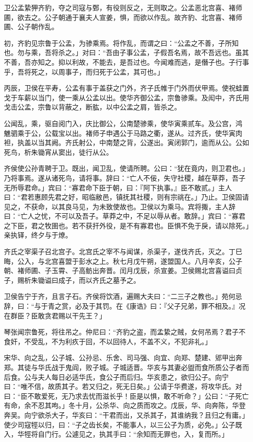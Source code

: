 \documentclass[]{article}
\begin{document}
卫公孟絷狎齐豹，夺之司寇与鄄，有役则反之，无则取之。公孟恶北宫喜、褚师圃，欲去之。公子朝通于襄夫人宣姜，惧，而欲以作乱。故齐豹、北宫喜、褚师圃、公子朝作乱。

初，齐豹见宗鲁于公孟，为骖乘焉。将作乱，而谓之曰：``公孟之不善，子所知也。勿与乘，吾将杀之。」对曰：``吾由子事公孟，子假吾名焉，故不吾远也。虽其不善，吾亦知之。抑以利故，不能去，是吾过也。今闻难而逃，是僭子也。子行事乎，吾将死之，以周事子，而归死于公孟，其可也。」

丙辰，卫侯在平寿，公孟有事于盖获之门外，齐子氏帷于门外而伏甲焉。使祝蛙置戈于车薪以当门，使一乘从公孟以出。使华齐御公孟，宗鲁骖乘。及闳中，齐氏用戈击公孟，宗鲁以背蔽之，断肱，以中公孟之肩，皆杀之。

公闻乱，乘，驱自阅门入，庆比御公，公南楚骖乘，使华寅乘贰车。及公宫，鸿\\
魋驷乘于公，公载宝以出。褚师子申遇公于马路之衢，遂从。过齐氏，使华寅肉袒，执盖以当其阙。齐氏射公，中南楚之背，公遂出。寅闭郭门，逾而从公。公如死鸟，析朱锄宵从窦出，徒行从公。

齐侯使公孙青聘于卫。既出，闻卫乱，使请所聘。公曰：``犹在竟内，则卫君也。」乃将事焉。遂从诸死鸟，请将事。辞曰：``亡人不佞，失守社稷，越在草莽，吾子无所辱君命。」宾曰：``寡君命下臣于朝，曰：『阿下执事。』臣不敢贰。」主人曰：``君若惠顾先君之好，昭临敝邑，镇抚其社稷，则有宗祧在。」乃止。卫侯固请见之，不获命，以其良马见，为未致使故也。卫侯以为乘马。宾将掫，主人辞曰：``亡人之忧，不可以及吾子。草莽之中，不足以辱从者。敢辞。」宾曰：``寡君之下臣，君之牧圉也。若不获扞外役，是不有寡君也。臣惧不免于戾，请以除死。」亲执铎，终夕与于燎。

齐氏之宰渠子召北宫子。北宫氏之宰不与闻谋，杀渠子，遂伐齐氏，灭之。丁巳晦，公入，与北宫喜盟于彭水之上。秋七月戊午朔，遂盟国人。八月辛亥，公子朝、褚师圃、子玉霄、子高鲂出奔晋。闰月戊辰，杀宣姜。卫侯赐北宫喜谥曰贞子，赐析朱锄谥曰成子，而以齐氏之墓予之。

卫侯告宁于齐，且言子石。齐侯将饮酒，遍赐大夫曰：``二三子之教也。」苑何忌辞，曰：``与于青之赏，必及于其罚。在《康诰》曰：『父子兄弟，罪不相及。』况在群臣？臣敢贪君赐以干先王？」

琴张闻宗鲁死，将往吊之。仲尼曰：``齐豹之盗，而孟絷之贼，女何吊焉？君子不食奸，不受乱，不为利疚于回，不以回待人，不盖不义，不犯非礼。」

宋华、向之乱，公子城、公孙忌、乐舍、司马强、向宜、向郑、楚建、郳甲出奔郑。其徒与华氏战于鬼阎，败子城。子城适晋。华亥与其妻必盥而食所质公子者而后食。公与夫人每日必适华氏，食公子而后归。华亥患之，欲归公子。向宁曰：``唯不信，故质其子。若又归之，死无日矣。」公请于华费遂，将攻华氏。对曰：``臣不敢爱死，无乃求去忧而滋长乎！臣是以惧，敢不听命？」公曰：``子死亡有命，余不忍其呴。」冬十月，公杀华、向之质而攻之。戊辰，华、向奔陈，华登奔吴。向宁欲杀大子，华亥曰：``干君而出，又杀其子，其谁纳我？且归之有庸。」使少司寇牼以归，曰：``子之齿长矣，不能事人，以三公子为质，必免。」公子既入，华牼将自门行。公遽见之，执其手曰：``余知而无罪也，入，复而所。」
\end{document}
